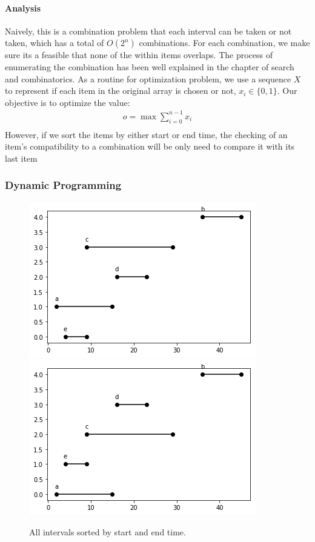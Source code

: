 \documentclass[../main.tex]{subfiles}
\begin{document}
\paragraph{Analysis} Naively, this is a combination problem that each interval can be taken or not taken, which has a total of $O(2^n)$ combinations. For each combination, we make sure its a feasible that none of the within items overlaps. The process of enumerating the combination has been well explained  in the chapter of search and combinatorics. As a routine for optimization problem, we use a sequence $X$ to represent if each item in the original array is chosen or not, $x_i\in \{0, 1\}$. Our objective is to optimize the value:
\begin{align}
    o = \max \sum_{i=0}^{n-1} x_i \\
\end{align}
However, if we sort the items by either start or end time, the checking of an item's compatibility to a combination will be only need to compare it with its last item

\subsubsection{Dynamic Programming}
\begin{figure}[H]
    \centering
    \includegraphics[width=0.49\columnwidth]{fig/greedy_schedule_all_intervals_sorting_finish.png}
    \includegraphics[width=0.49\columnwidth]{fig/greedy_schedule_all_intervals_sorting.png}
    \caption{All intervals sorted by start and end time.}
    \label{fig:greedy_intervals_sort_types}
\end{figure}
\end{document}
